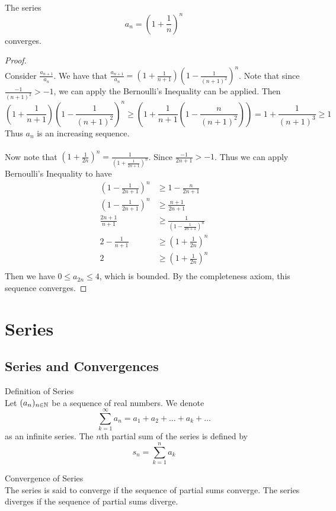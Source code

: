 \documentclass[a4paper]{article}
\begin{document}
\begin{crl}{}{}\\ The series $$a_n=\left(1+\frac{1}{n}\right)^n$$ converges. 
\begin{proof}\\ Consider $\frac{a_{n+1}}{a_n}$. We have that $\frac{a_{n+1}}{a_n}=\left(1+\frac{1}{n+1}\right)\left(1-\frac{1}{(n+1)^2}\right)^n$. Note that since $\frac{-1}{(n+1)^2}>-1$, we can apply the Bernoulli's Inequality can be applied. Then $$\left(1+\frac{1}{n+1}\right)\left(1-\frac{1}{(n+1)^2}\right)^n\geq\left(1+\frac{1}{n+1}\left(1-\frac{n}{(n+1)^2}\right)\right)=1+\frac{1}{(n+1)^3}\geq 1$$ Thus $a_n$ is an increasing sequence. 
\\~\\ Now note that $\left(1+\frac{1}{2n}\right)^n=\frac{1}{\left(1+\frac{1}{2n+1}\right)^n}$. Since $\frac{-1}{2n+1}>-1$. Thus we can apply Bernoulli's Inequality to have 
\begin{align*}
\left(1-\frac{1}{2n+1}\right)^n&\geq1-\frac{n}{2n+1} \\
\left(1-\frac{1}{2n+1}\right)^n&\geq\frac{n+1}{2n+1} \\
\frac{2n+1}{n+1}&\geq\frac{1}{\left(1-\frac{1}{2n+1}\right)^n} \\
2-\frac{1}{n+1}&\geq\left(1+\frac{1}{2n}\right)^n \\
2&\geq\left(1+\frac{1}{2n}\right)^n \\
\end{align*}
Then we have $0\leq a_{2n}\leq 4$, which is bounded. By the completeness axiom, this sequence converges. 
\end{proof}
\end{crl}

\pagebreak
\section{Series}
\subsection{Series and Convergences}
\begin{defn}{Definition of Series}{}\\ Let $(a_n)_{n\in\mathbb{N}}$ be a sequence of real numbers. We denote $$\sum_{k=1}^{\infty}a_n=a_1+a_2+\dots+a_k+\dots$$ as an infinite series. The $n$th partial sum of the series is defined by $$s_n=\sum_{k=1}^{n}a_k$$
\end{defn} 

\begin{defn}{Convergence of Series}{}\\ The series is said to converge if the sequence of partial sums converge. The series diverges if the sequence of partial sums diverge. 
\end{defn}
\end{document}
